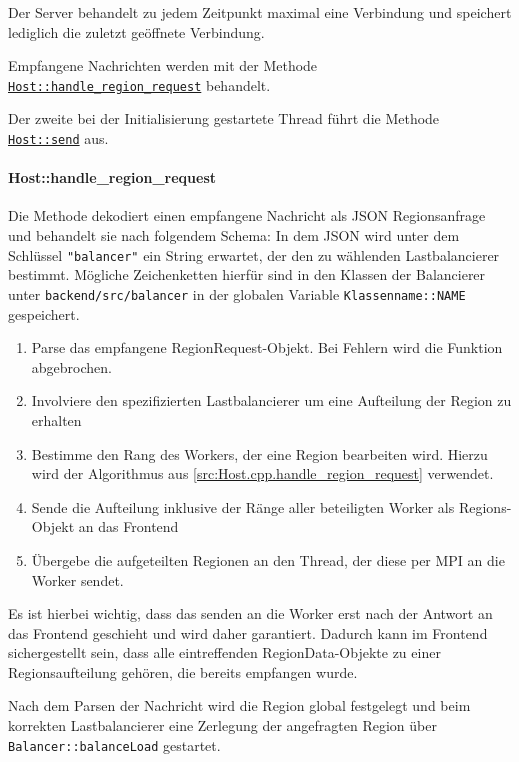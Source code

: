 Der Server behandelt zu jedem Zeitpunkt maximal eine Verbindung und speichert lediglich die zuletzt geöffnete Verbindung.

Empfangene Nachrichten werden mit der Methode \hyperref[cls:Host::handle_region_request]{\texttt{Host::handle\_region\_request}} behandelt.

Der zweite bei der Initialisierung gestartete Thread führt die Methode \hyperref[cls:Host::send]{\texttt{Host::send}} aus.

\paragraph{Host::handle\_region\_request}\label{cls:Host::handle_region_request}

Die Methode dekodiert einen empfangene Nachricht als JSON Regionsanfrage und behandelt sie nach folgendem Schema:
In dem JSON wird unter dem Schlüssel \verb|"balancer"| ein String erwartet, der den zu wählenden Lastbalancierer bestimmt.
Mögliche Zeichenketten hierfür sind in den Klassen der Balancierer unter \verb|backend/src/balancer| in der globalen Variable
\verb|Klassenname::NAME| gespeichert.

\begin{enumerate}
	\item Parse das empfangene RegionRequest-Objekt. Bei Fehlern wird die Funktion abgebrochen.
	\item Involviere den spezifizierten Lastbalancierer um eine Aufteilung der Region zu erhalten
	\item Bestimme den Rang des Workers, der eine Region bearbeiten wird. Hierzu wird der Algorithmus aus \autoref{src:Host.cpp.handle_region_request} verwendet.
	\item Sende die Aufteilung inklusive der Ränge aller beteiligten Worker als Regions-Objekt an das Frontend
	\item Übergebe die aufgeteilten Regionen an den Thread, der diese per MPI an die Worker sendet.
\end{enumerate}

Es ist hierbei wichtig, dass das senden an die Worker erst nach der Antwort an das Frontend geschieht und wird daher garantiert.
Dadurch kann im Frontend sichergestellt sein, dass alle eintreffenden RegionData-Objekte zu einer Regionsaufteilung gehören,
die bereits empfangen wurde.





Nach dem Parsen der Nachricht wird die Region global festgelegt und beim korrekten Lastbalancierer eine Zerlegung der angefragten Region über \verb|Balancer::balanceLoad| gestartet.

